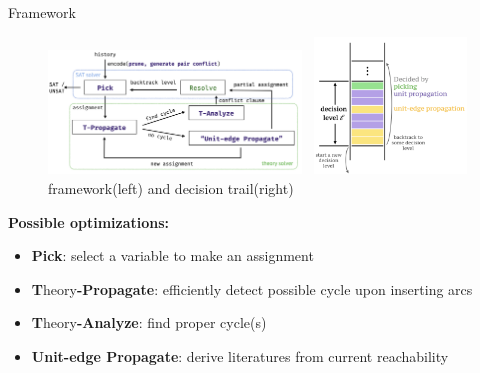 \begin{frame}{Framework}

	\begin{figure}[H]
		\centering
		\includegraphics[width=0.6\textwidth]{figs/acyclic-minisat-framework.png}~
		\includegraphics[width=0.36\textwidth]{figs/acyclic-minisat-decision-trail.png}
		\vspace*{0.30cm}
		\footnotesize{framework(left) and decision trail(right)}
	\end{figure}

	\footnotesize{\textcolor[RGB]{71,46,125}{\textbf{Possible optimizations:}}}
	\scriptsize{
		\begin{itemize}
			\item \textcolor[RGB]{71,46,125}{\textbf{Pick}}: select a variable to make an assignment
			\item \textcolor[RGB]{71,46,125}{\textbf{T}}heory\textcolor[RGB]{71,46,125}{\textbf{-Propagate}}: efficiently detect possible cycle upon inserting arcs
			\item \textcolor[RGB]{71,46,125}{\textbf{T}}heory\textcolor[RGB]{71,46,125}{\textbf{-Analyze}}: find proper cycle(s)
			\item \textcolor[RGB]{71,46,125}{\textbf{Unit-edge Propagate}}: derive literatures from current reachability
		\end{itemize}
	}
\end{frame}

